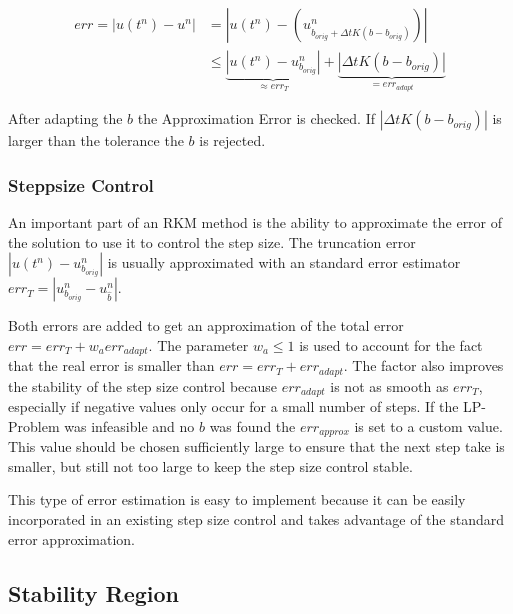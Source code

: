 \documentclass[a4paper]{scrartcl}
\numberwithin{equation}{section}
\theoremstyle{plain}
\theoremstyle{definition}
\numberwithin{theorem}{section}
\newcommand{\dt}{{\Delta t}}
\newcommand{\1}{\mathbbm{1}}
\begin{document}
\begin{align}
err = |u(t^n)-u^n| &= |u(t^n) - (u^n_{b_{orig}+\dt K(b-b_{orig})})| \\
 &\leq \underbrace{|u(t^n)-u^n_{b_{orig}}|}_{\approx err_T}+\underbrace{|\dt K(b-b_{orig})|}_{= err_{adapt}}
\end{align}

After adapting the $b$ the Approximation Error is checked. If $|\dt K(b-b_{orig})|$ is larger than the tolerance the $b$ is rejected. 

\subsubsection{Steppsize Control}
An important part of an RKM method is the ability to approximate the error of the solution to use it to control the step size. 
The truncation error $|u(t^n)-u^n_{b_{orig}}|$ is usually approximated with an standard error estimator $err_T = | u^{n}_{b_{orig}} - u^{n}_{\hat{b}} |$.

Both errors are added to get an approximation of the total error $err = err_T +w_a err_{adapt}$. The parameter $w_a \leq 1$ is used to account for the fact that the real error is smaller than $err = err_T +err_{adapt}$. The factor also improves the stability of the step size control because $err_{adapt}$ is not as smooth as $err_T$, especially if negative values only occur for a small number of steps.
If the LP-Problem was infeasible and no $b$ was found the $err_{approx}$ is set to a custom value. This value should be chosen sufficiently large to ensure that the next step take is smaller, but still not too large to keep the step size control stable.

This type of error estimation is easy to implement because it can be easily incorporated in an existing step size control and takes advantage of the standard error approximation.


\subsection{Stability Region}
\end{document}

